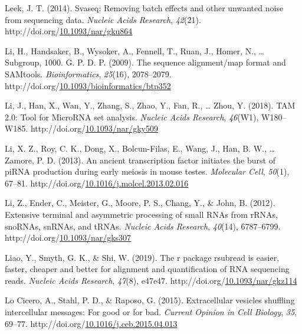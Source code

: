 \documentclass[12pt,twoside]{reedthesis}
\newlength{\cslhangindent}
\newenvironment{CSLReferences}[2] %
 {%
  \setlength{\parindent}{0pt}
  \ifodd #1 \everypar{\setlength{\hangindent}{\cslhangindent}}\ignorespaces\fi
  \ifnum #2 > 0
  \setlength{\parskip}{#2\baselineskip}
  \fi
 }%
 {}
\begin{document}
\begin{CSLReferences}{1}{0}
\leavevmode{}%
Leek, J. T. (2014). Svaseq: Removing batch effects and other unwanted noise from sequencing data. \emph{Nucleic Acids Research}, \emph{42}(21). http://doi.org/\href{https://doi.org/10.1093/nar/gku864}{10.1093/nar/gku864}

\leavevmode{}%
Li, H., Handsaker, B., Wysoker, A., Fennell, T., Ruan, J., Homer, N., \ldots{} Subgroup, 1000. G. P. D. P. (2009). The sequence alignment/map format and SAMtools. \emph{Bioinformatics}, \emph{25}(16), 2078--2079. http://doi.org/\href{https://doi.org/10.1093/bioinformatics/btp352}{10.1093/bioinformatics/btp352}

\leavevmode{}%
Li, J., Han, X., Wan, Y., Zhang, S., Zhao, Y., Fan, R., \ldots{} Zhou, Y. (2018). TAM 2.0: Tool for MicroRNA set analysis. \emph{Nucleic Acids Research}, \emph{46}(W1), W180--W185. http://doi.org/\href{https://doi.org/10.1093/nar/gky509}{10.1093/nar/gky509}

\leavevmode{}%
Li, X. Z., Roy, C. K., Dong, X., Bolcun-Filas, E., Wang, J., Han, B. W., \ldots{} Zamore, P. D. (2013). An ancient transcription factor initiates the burst of piRNA production during early meiosis in mouse testes. \emph{Molecular Cell}, \emph{50}(1), 67--81. http://doi.org/\href{https://doi.org/10.1016/j.molcel.2013.02.016}{10.1016/j.molcel.2013.02.016}

\leavevmode{}%
Li, Z., Ender, C., Meister, G., Moore, P. S., Chang, Y., \& John, B. (2012). Extensive terminal and asymmetric processing of small RNAs from rRNAs, snoRNAs, snRNAs, and tRNAs. \emph{Nucleic Acids Research}, \emph{40}(14), 6787--6799. http://doi.org/\href{https://doi.org/10.1093/nar/gks307}{10.1093/nar/gks307}

\leavevmode{}%
Liao, Y., Smyth, G. K., \& Shi, W. (2019). The r package rsubread is easier, faster, cheaper and better for alignment and quantification of RNA sequencing reads. \emph{Nucleic Acids Research}, \emph{47}(8), e47e47. http://doi.org/\href{https://doi.org/10.1093/nar/gkz114}{10.1093/nar/gkz114}

\leavevmode{}%
Lo Cicero, A., Stahl, P. D., \& Raposo, G. (2015). Extracellular vesicles shuffling intercellular messages: For good or for bad. \emph{Current Opinion in Cell Biology}, \emph{35}, 69--77. http://doi.org/\href{https://doi.org/10.1016/j.ceb.2015.04.013}{10.1016/j.ceb.2015.04.013}


\end{CSLReferences}
\end{document}
